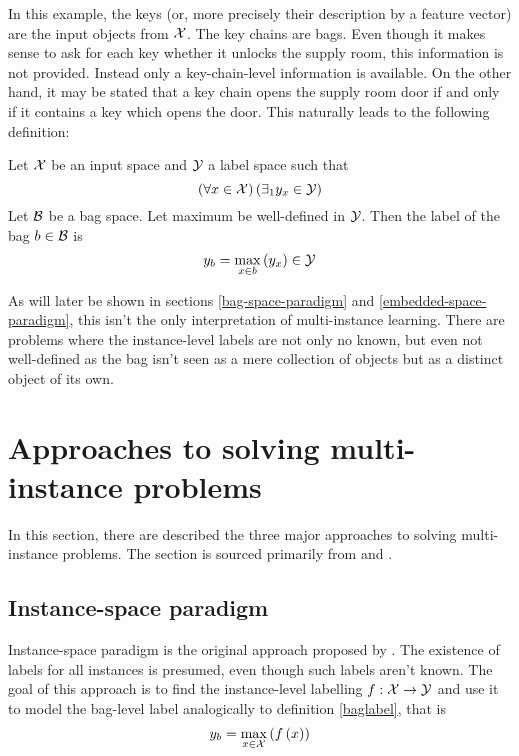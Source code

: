 In this example, the keys (or, more precisely their description by a feature vector) are the input objects from \( \mathcal{X} \). The key chains are bags. Even though it makes sense to ask for each key whether it unlocks the supply room, this information is not provided. Instead only a key-chain-level information is available. On the other hand, it may be stated that a key chain opens the supply room door if and only if it contains a key which opens the door. This naturally leads to the following definition:

\begin{define}\label{baglabel}
	Let \( \mathcal{X} \) be an input space and \( \mathcal{Y} \) a label space such that
	\[ \left( \forall x \in \mathcal{X} \right) \left( \exists_1 y_x \in \mathcal{Y} \right) \]
	Let \( \mathcal{B} \) be a bag space. Let maximum be well-defined in \( \mathcal{Y} \). Then the label of the bag \( b \in \mathcal{B} \) is
	\[ y_b = \max_{x \in b} \left( y_x \right) \in \mathcal{Y} \]
\end{define}

As will later be shown in sections \ref{bag-space-paradigm} and \ref{embedded-space-paradigm}, this isn't the only interpretation of multi-instance learning. There are problems where the instance-level labels are not only no known, but even not well-defined as the bag isn't seen as a mere collection of objects but as a distinct object of its own.

\section{Approaches to solving multi-instance problems}
In this section, there are described the three major approaches to solving multi-instance problems. The section is sourced primarily from \cite{pevny_using_2017} and \cite{pevny_discriminative_2016}.

\subsection{Instance-space paradigm}
Instance-space paradigm is the original approach proposed by \cite{dietterich_solving_1997}. The existence of labels for all instances is presumed, even though such labels aren't known. The goal of this approach is to find the instance-level labelling \( f : \mathcal{X} \to \mathcal{Y} \) and use it to model the bag-level label analogically to definition \ref{baglabel}, that is
\[ y_b = \max_{x \in \mathcal{X} } \left( f \left( x \right) \right) \]

